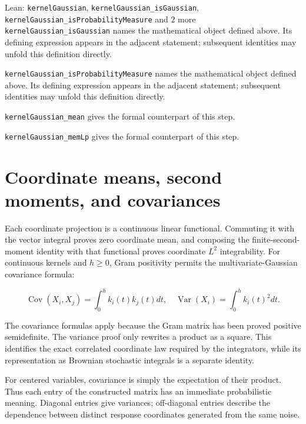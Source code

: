 \documentclass[11pt,a4paper]{article}
\begin{document}
\begin{leanbox}{Lean: \texttt{kernelGaussian}, \texttt{kernelGaussian\_\allowbreak{}isGaussian}, \texttt{kernelGaussian\_\allowbreak{}isProbabilityMeasure} and 2 more}
\texttt{kernel\allowbreak{}Gaussian\_\allowbreak{}is\allowbreak{}Gaussian} names the mathematical object defined above. Its defining expression appears in the adjacent statement; subsequent identities may unfold this definition directly.




\texttt{kernel\allowbreak{}Gaussian\_\allowbreak{}is\allowbreak{}Probability\allowbreak{}Measure} names the mathematical object defined above. Its defining expression appears in the adjacent statement; subsequent identities may unfold this definition directly.




\texttt{kernel\allowbreak{}Gaussian\_\allowbreak{}mean} gives the formal counterpart of this step.




\texttt{kernel\allowbreak{}Gaussian\_\allowbreak{}mem\allowbreak{}Lp} gives the formal counterpart of this step.
\end{leanbox}

\section{\texorpdfstring{Coordinate means, second moments, and covariances}{Coordinate means, second moments, and covariances}}


Each coordinate projection is a continuous linear functional. Commuting it with the vector integral proves zero coordinate mean, and composing the finite-second-moment identity with that functional proves coordinate \(L^{2}\) integrability. For continuous kernels and \(h\ge0\), Gram positivity permits the multivariate-Gaussian covariance formula:

\[\operatorname{Cov}(X_i,X_j)=\int_0^hk_i(t)k_j(t)dt,\quad
\operatorname{Var}(X_i)=\int_0^hk_i(t)^2dt.\]

The covariance formulas apply because the Gram matrix has been proved positive semidefinite. The variance proof only rewrites a product as a square. This identifies the exact correlated coordinate law required by the integrators, while its representation as Brownian stochastic integrals is a separate identity.



For centered variables, covariance is simply the expectation of their product. Thus each entry of the constructed matrix has an immediate probabilistic meaning. Diagonal entries give variances; off-diagonal entries describe the dependence between distinct response coordinates generated from the same noise.
\end{document}
